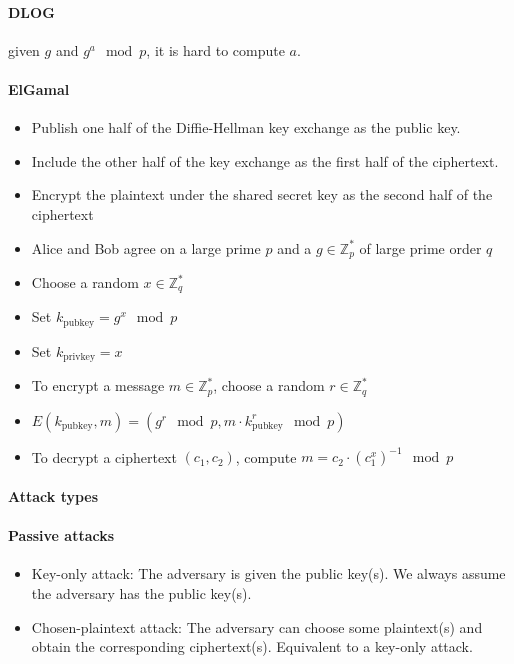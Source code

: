 \documentclass[11pt]{article}
\begin{document}
\paragraph{DLOG} given $g$ and $g^a \mod p$, it is hard to compute $a$.

\paragraph{ElGamal}

\begin{itemize}
  \item Publish one half of the Diffie-Hellman key exchange as the public key.
  \item Include the other half of the key exchange as the first half of the ciphertext.
  \item Encrypt the plaintext under the shared secret key as the second half of the ciphertext
\end{itemize}

\begin{itemize}
  \item Alice and Bob agree on a large prime $p$ and a $g \in \mathbb{Z}_p^*$ of large prime order $q$
  \item Choose a random $x \in \mathbb{Z}_q^*$
  \item Set $k_{\text{pubkey}} = g^x \mod p$
  \item Set $k_{\text{privkey}} = x$
  \item To encrypt a message $m \in \mathbb{Z}_p^*$, choose a random $r \in \mathbb{Z}_q^*$
  \item $E(k_{\text{pubkey}}, m) = (g^r \mod p, m \cdot k_{\text{pubkey}}^r \mod p)$
  \item To decrypt a ciphertext $(c_1, c_2)$, compute $m = c_2 \cdot (c_1^x)^{-1} \mod p$
\end{itemize}

\paragraph{Attack types}

\paragraph{Passive attacks}
\begin{itemize}
  \item Key-only attack: The adversary is given the public key(s).
  We always assume the adversary has the public key(s).
  \item Chosen-plaintext attack: The adversary can choose some plaintext(s) and obtain the
  corresponding ciphertext(s). Equivalent to a key-only attack.
\end{itemize}
\end{document}
